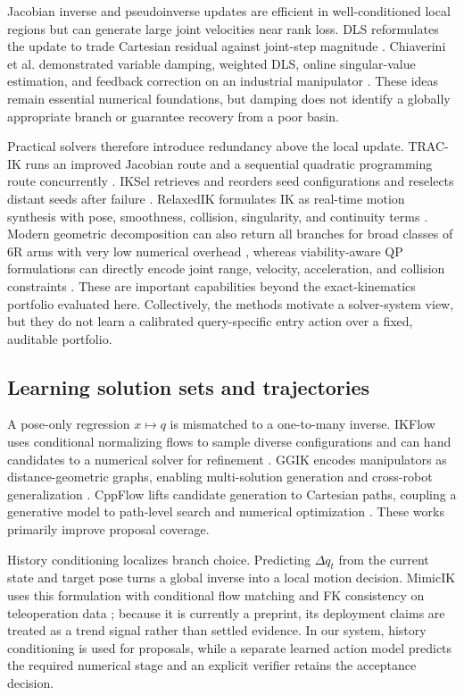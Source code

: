 \documentclass[10pt,a4paper]{article}
\begin{document}
Jacobian inverse and pseudoinverse updates are efficient in well-conditioned local
regions but can generate large joint velocities near rank loss. DLS reformulates the
update to trade Cartesian residual against joint-step magnitude
\cite{wampler1986dls,nakamura1986singularity}. Chiaverini et al. demonstrated variable
damping, weighted DLS, online singular-value estimation, and feedback correction on an
industrial manipulator \cite{chiaverini1994review}. These ideas remain essential
numerical foundations, but damping does not identify a globally appropriate branch or
guarantee recovery from a poor basin.

Practical solvers therefore introduce redundancy above the local update. TRAC-IK runs
an improved Jacobian route and a sequential quadratic programming route concurrently
\cite{beeson2015tracik}. IKSel retrieves and reorders seed configurations and reselects
distant seeds after failure \cite{yuan2025iksel}. RelaxedIK formulates IK as real-time
motion synthesis with pose, smoothness, collision, singularity, and continuity terms
\cite{rakita2018relaxedik}. Modern geometric decomposition can also return all branches
for broad classes of 6R arms with very low numerical overhead \cite{elias2025ikgeo},
whereas viability-aware QP formulations can directly encode joint range, velocity,
acceleration, and collision constraints \cite{zhang2026viability}. These are important
capabilities beyond the exact-kinematics portfolio evaluated here. Collectively, the
methods motivate a solver-system view, but they do not learn a calibrated
query-specific entry action over a fixed, auditable portfolio.

\subsection{Learning solution sets and trajectories}

A pose-only regression $x\mapsto q$ is mismatched to a one-to-many inverse. IKFlow uses
conditional normalizing flows to sample diverse configurations and can hand candidates
to a numerical solver for refinement \cite{ames2022ikflow}. GGIK encodes manipulators
as distance-geometric graphs, enabling multi-solution generation and cross-robot
generalization \cite{limoyo2025ggik}. CppFlow lifts candidate generation to Cartesian
paths, coupling a generative model to path-level search and numerical optimization
\cite{morgan2024cppflow}. These works primarily improve proposal coverage.

History conditioning localizes branch choice. Predicting $\Delta q_t$ from the current
state and target pose turns a global inverse into a local motion decision. MimicIK uses
this formulation with conditional flow matching and FK consistency on teleoperation
data \cite{yang2026mimik}; because it is currently a preprint, its deployment claims
are treated as a trend signal rather than settled evidence. In our system, history
conditioning is used for proposals, while a separate learned action model predicts
the required numerical stage and an explicit verifier retains the acceptance decision.
\end{document}
